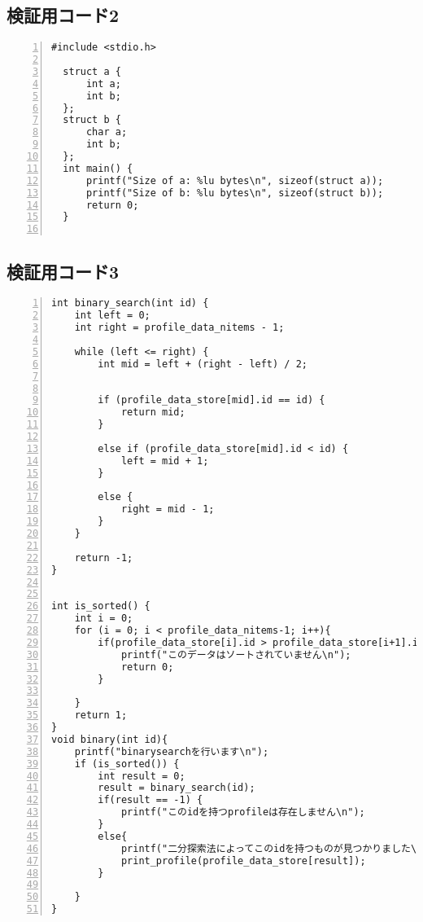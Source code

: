 \subsection{検証用コード2}\label{code2}
\begin{Verbatim}[numbers=left, xleftmargin=10mm, numbersep=6pt,
  fontsize=\small, baselinestretch=0.8]
  #include <stdio.h>

  struct a {
      int a;
      int b;
  };
  struct b {
      char a;
      int b;
  };
  int main() {
      printf("Size of a: %lu bytes\n", sizeof(struct a));
      printf("Size of b: %lu bytes\n", sizeof(struct b));
      return 0;
  }


\end{Verbatim}
\subsection{検証用コード3}\label{code3}
\begin{Verbatim}[numbers=left, xleftmargin=10mm, numbersep=6pt,
  fontsize=\small, baselinestretch=0.8]
  int binary_search(int id) {
    int left = 0;
    int right = profile_data_nitems - 1;

    while (left <= right) {
        int mid = left + (right - left) / 2;

     
        if (profile_data_store[mid].id == id) {
            return mid;
        }
     
        else if (profile_data_store[mid].id < id) {
            left = mid + 1;
        }
 
        else {
            right = mid - 1;
        }
    }

    return -1;
}


int is_sorted() {
    int i = 0;
    for (i = 0; i < profile_data_nitems-1; i++){
        if(profile_data_store[i].id > profile_data_store[i+1].id){
            printf("このデータはソートされていません\n");
            return 0;
        }
      
    }
    return 1;
}
void binary(int id){
    printf("binarysearchを行います\n");
    if (is_sorted()) {
        int result = 0;
        result = binary_search(id);
        if(result == -1) {
            printf("このidを持つprofileは存在しません\n");
        }
        else{
            printf("二分探索法によってこのidを持つものが見つかりました\n");
            print_profile(profile_data_store[result]);
        }
        
    }
}
\end{Verbatim}

